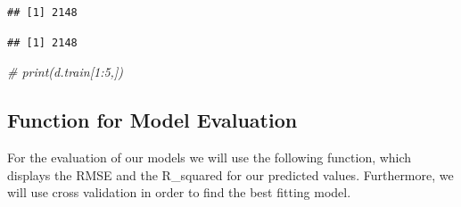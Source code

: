 \documentclass[
]{article}
\newenvironment{Shaded}{\begin{snugshade}}{\end{snugshade}}
\newcommand{\AttributeTok}[1]{\textcolor[rgb]{0.77,0.63,0.00}{#1}}
\newcommand{\CommentTok}[1]{\textcolor[rgb]{0.56,0.35,0.01}{\textit{#1}}}
\newcommand{\ConstantTok}[1]{\textcolor[rgb]{0.00,0.00,0.00}{#1}}
\newcommand{\DecValTok}[1]{\textcolor[rgb]{0.00,0.00,0.81}{#1}}
\newcommand{\FunctionTok}[1]{\textcolor[rgb]{0.00,0.00,0.00}{#1}}
\newcommand{\NormalTok}[1]{#1}
\newcommand{\OtherTok}[1]{\textcolor[rgb]{0.56,0.35,0.01}{#1}}
\newcommand{\SpecialCharTok}[1]{\textcolor[rgb]{0.00,0.00,0.00}{#1}}
\begin{document}
\begin{Shaded}
\end{Shaded}

\begin{verbatim}
## [1] 2148
\end{verbatim}

\begin{Shaded}
\end{Shaded}

\begin{verbatim}
## [1] 2148
\end{verbatim}

\begin{Shaded}
\begin{Highlighting}[]
\CommentTok{\# print(d.train[1:5,])}
\end{Highlighting}
\end{Shaded}

\hypertarget{function-for-model-evaluation}{%
\subsection{Function for Model
Evaluation}\label{function-for-model-evaluation}}

For the evaluation of our models we will use the following function,
which displays the RMSE and the R\_squared for our predicted values.
Furthermore, we will use cross validation in order to find the best
fitting model.
\end{document}
